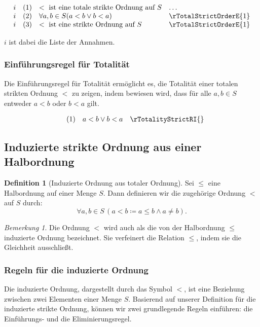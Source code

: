 \documentclass{book}
\theoremstyle{plain}
\theoremstyle{remark}
\newtheorem*{remark}{Bemerkung}
\theoremstyle{definition}
\newtheorem{definition}{Definition}[section]
\begin{document}
\[
\begin{array}{llll}
    i       & (1) & < \text{ ist eine totale strikte Ordnung auf } S & \dots \\
    i       & (2) & \forall a, b \in S (a < b \lor b < a) & \rTotalStrictOrderE{1} \\
    i       & (3) & < \text{ ist eine strikte Ordnung auf }S & \rTotalStrictOrderE{1}
\end{array}
\]

\(i\) ist dabei die Liste der Annahmen.

\subsubsection*{Einführungsregel für Totalität}
\label{rule:rTotalityStrictRI}
Die Einführungsregel für Totalität ermöglicht es, die Totalität einer totalen strikten Ordnung \(<\) zu zeigen, indem bewiesen wird, dass für alle \(a, b \in S\) entweder \(a < b\) oder \(b < a\) gilt.

\[
\begin{array}{llll}
       & (1) & a < b \lor b < a & \rTotalityStrictRI{}
\end{array}
\]

\subsection{Induzierte strikte Ordnung aus einer Halbordnung}

\begin{definition}[Induzierte Ordnung aus totaler Ordnung]
    Sei \(\leq\) eine Halbordnung auf einer Menge \(S\). Dann definieren wir die zugehörige Ordnung \(<\) auf \(S\) durch:
    \[
    \forall a, b \in S \, (a < b \coloneqq a \leq b \land a \neq b).
    \]
\end{definition}

\begin{remark}
    Die Ordnung \(<\) wird auch als die von der Halbordnung \(\leq\) induzierte  Ordnung bezeichnet. Sie verfeinert die Relation \(\leq\), indem sie die Gleichheit ausschließt.
\end{remark}

\subsubsection{Regeln für die induzierte Ordnung}
\label{rule:InducedStrictOrderE} \label{rule:InducedStrictOrderI}

Die induzierte Ordnung, dargestellt durch das Symbol \(<\), ist eine Beziehung zwischen zwei Elementen einer Menge \(S\). Basierend auf unserer Definition für die induzierte strikte Ordnung, können wir zwei grundlegende Regeln einführen: die Einführungs- und die Eliminierungsregel.
\end{document}

